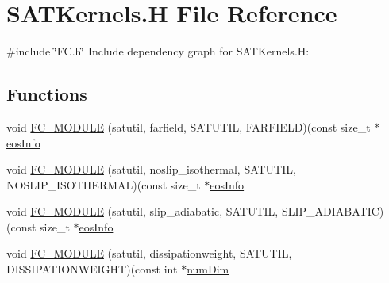 \hypertarget{SATKernels_8H}{}\section{S\+A\+T\+Kernels.\+H File Reference}
\label{SATKernels_8H}
{\ttfamily \#include \char`\"{}F\+C.\+h\char`\"{}}\newline
Include dependency graph for S\+A\+T\+Kernels.\+H\+:
\subsection*{Functions}
\begin{DoxyCompactItemize}
\item 
void \hyperlink{SATKernels_8H_a41ee11e8608507f5a6db117547de6eb0}{F\+C\+\_\+\+M\+O\+D\+U\+LE} (satutil, farfield, S\+A\+T\+U\+T\+IL, F\+A\+R\+F\+I\+E\+LD)(const size\+\_\+t $\ast$\hyperlink{WENOKernels_8H_a9b67b225dd1b2bffc0623aa04a80bfc4}{eos\+Info}
\item 
void \hyperlink{SATKernels_8H_a95400afa9a1e488275a30fbf78f038c0}{F\+C\+\_\+\+M\+O\+D\+U\+LE} (satutil, noslip\+\_\+isothermal, S\+A\+T\+U\+T\+IL, N\+O\+S\+L\+I\+P\+\_\+\+I\+S\+O\+T\+H\+E\+R\+M\+AL)(const size\+\_\+t $\ast$\hyperlink{WENOKernels_8H_a9b67b225dd1b2bffc0623aa04a80bfc4}{eos\+Info}
\item 
void \hyperlink{SATKernels_8H_a36a1c22ed90f6a4ad9ffbe79109252c1}{F\+C\+\_\+\+M\+O\+D\+U\+LE} (satutil, slip\+\_\+adiabatic, S\+A\+T\+U\+T\+IL, S\+L\+I\+P\+\_\+\+A\+D\+I\+A\+B\+A\+T\+IC)(const size\+\_\+t $\ast$\hyperlink{WENOKernels_8H_a9b67b225dd1b2bffc0623aa04a80bfc4}{eos\+Info}
\item 
void \hyperlink{SATKernels_8H_a7dadf319d627db5174b922d8a9af8aeb}{F\+C\+\_\+\+M\+O\+D\+U\+LE} (satutil, dissipationweight, S\+A\+T\+U\+T\+IL, D\+I\+S\+S\+I\+P\+A\+T\+I\+O\+N\+W\+E\+I\+G\+HT)(const int $\ast$\hyperlink{SATKernels_8H_a680185db8546de161968dabace9e94f1}{num\+Dim}
\end{DoxyCompactItemize}
